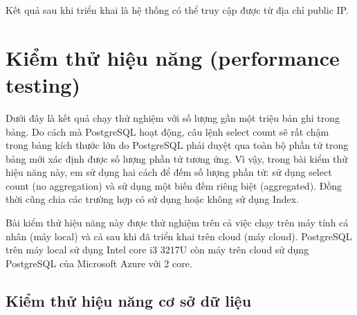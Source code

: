 Kết quả sau khi triển khai là hệ thống có thể truy cập được
từ địa chỉ public IP.

\section{Kiểm thử hiệu năng (performance testing)}
Dưới đây là kết quả chạy thử nghiệm với số
lượng gần một triệu bản ghi trong bảng. Do cách mà PostgreSQL
hoạt động, câu lệnh select count sẽ rất chậm trong bảng kích thước lớn
do PostgreSQL phải duyệt qua toàn bộ phần tử trong bảng mới
xác định được số lượng phần tử tương ứng. Vì vậy, trong bài kiểm
thử hiệu năng này, em sử dụng hai cách để đếm 
số lượng phần tử: sử dụng select count (no aggregation) và 
sử dụng một biến đếm riêng biệt (aggregated). Đồng thời cũng chia
các trường hợp có sử dụng hoặc không sử dụng Index.

Bài kiểm thử hiệu năng này được thử nghiệm trên cả việc chạy trên máy tính
cá nhân (máy local) và cả sau khi đã triển khai trên cloud (máy cloud).
PostgreSQL trên máy local sử dụng Intel core i3 3217U còn máy trên
cloud sử dụng PostgreSQL của Microsoft Azure với 2 core.

\subsection{Kiểm thử hiệu năng cơ sở dữ liệu}
